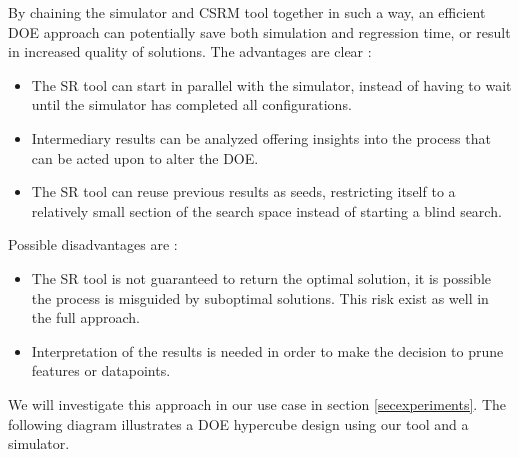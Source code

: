 By chaining the simulator and CSRM tool together in such a way, an efficient DOE approach can potentially save both simulation and regression time, or result in increased quality of solutions. 
The advantages are clear :
\begin{itemize}
\item The SR tool can start in parallel with the simulator, instead of having to wait until the simulator has completed all configurations.
\item Intermediary results can be analyzed offering insights into the process that can be acted upon to alter the DOE.
\item The SR tool can reuse previous results as seeds, restricting itself to a relatively small section of the search space instead of starting a blind search.
\end{itemize}
Possible disadvantages are :
\begin{itemize}
\item The SR tool is not guaranteed to return the optimal solution, it is possible the process is misguided by suboptimal solutions. This risk exist as well in the full approach.
\item Interpretation of the results is needed in order to make the decision to prune features or datapoints.
\end{itemize}
We will investigate this approach in our use case in  section \ref{secexperiments}.
The following diagram illustrates a DOE hypercube design using our tool and a simulator. \\
